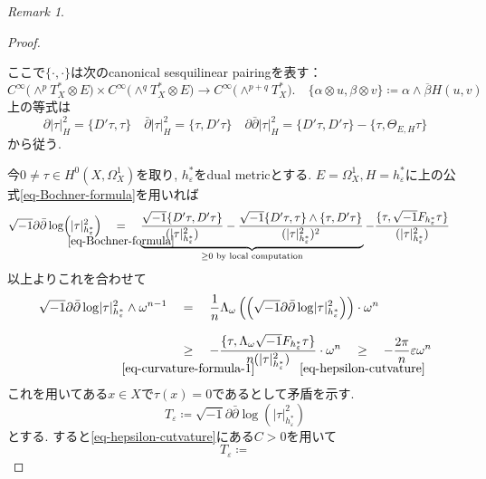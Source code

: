 \documentclass[dvipdfmx,a4paper,11pt]{article} %
\theoremstyle{definition}
\theoremstyle{remark}
\newtheorem{rem}[thm]{Remark}
\numberwithin{equation}{section}
\newcommand{\underalign}[2]{%
  \quad
  \underset{\mathclap{\raisebox{-1.6ex}{\ensuremath{\scriptstyle #1}}}}{#2}
  \quad
}
\begin{document}
\begin{rem}
\begin{proof}
\begin{tcolorbox}[mybox]
ここで$\{\cdot,\cdot\}$は次のcanonical sesquilinear pairingを表す：
\[
C^\infty\!\bigl(\wedge^p T_X^*\otimes E\bigr)
\times
C^\infty\!\bigl(\wedge^q T_X^*\otimes E\bigr)
\longrightarrow
C^\infty\!\bigl(\wedge^{p+q}T_X^*\bigr).
\quad
\{ \alpha \otimes u, \beta \otimes v\}\coloneqq \alpha \wedge \overline{\beta} H(u, v)
\]
上の等式は
\[
\partial \lvert\tau\rvert^{2}_{H} = \{ D'\tau, \tau\}
\quad 
\bar\partial \lvert\tau\rvert^{2}_{H} = \{ \tau, D'\tau\}
\quad
\partial \bar\partial \lvert\tau\rvert^{2}_{H}
= \{ D'\tau, D'\tau\} - \{\tau, \Theta_{E, H} \tau\}
\]
から従う. 
\end{tcolorbox}
今$0\neq\tau\in H^0(X,\Omega_X^1)$を取り, $h_\varepsilon^*$をdual metricとする.
$E=\Omega_{X}^{1}, H=h_\varepsilon^*$に上の公式\eqref{eq-Bochner-formula}を用いれば
\begin{equation}
\label{eq-curvature-formula-1}
\begin{aligned}
\sqrt{-1}\partial \bar\partial \log (\lvert\tau\rvert^{2}_{h_\varepsilon^*})
&\underalign{\eqref{eq-Bochner-formula}}{=}
\underbrace{
\frac{\sqrt{-1} \{ D'\tau, D'\tau\}  }{(\lvert\tau\rvert^{2}_{h_\varepsilon^*})}
- \frac{\sqrt{-1}  \{ D'\tau, \tau\} \wedge  \{ \tau, D'\tau\}}{(\lvert\tau\rvert^{2}_{h_\varepsilon^*})^2}
}_{\geq 0 \text{ by local computation}}  
- \frac{\{\tau, \sqrt{-1}F_{h_\varepsilon^*} \tau\}}{(\lvert\tau\rvert^{2}_{h_\varepsilon^*})}
\end{aligned}
\end{equation}
以上よりこれを合わせて
\begin{equation}
\label{eq-curvature-formula-2}
\begin{aligned}
\sqrt{-1}\partial\bar\partial\log\lvert\tau\rvert_{h_\varepsilon^*}^2\wedge\omega^{n-1}
&\underalign{}{=}
\frac{1}{n}
\Lambda_{\omega}\left(\left(\sqrt{-1}\partial\bar\partial\log\lvert\tau\rvert_{h_\varepsilon^*}^2 \right)\right)\cdot\omega^{n}
\\
&\underalign{\eqref{eq-curvature-formula-1}}{\geq}
- \frac{\{\tau, \Lambda_{\omega}\sqrt{-1}F_{h_\varepsilon^*} \tau\}}{n (\lvert\tau\rvert^{2}_{h_\varepsilon^*})}
\cdot\omega^{n}
\underalign{\eqref{eq-hepsilon-cutvature}}{\geq}
-\frac{2 \pi}{n}\varepsilon\omega^n
\end{aligned}
\end{equation}
これを用いてある$x\in X$で$\tau(x)=0$であるとして矛盾を示す. 
\[
T_\varepsilon \coloneqq  \sqrt{-1}\partial \bar\partial \log (\lvert\tau\rvert^{2}_{h_\varepsilon^*})
\]
とする. 
すると\eqref{eq-hepsilon-cutvature}にある$C>0$を用いて
\[
T_\varepsilon \coloneqq  
\]
\end{proof}
\end{rem}
\end{document}
